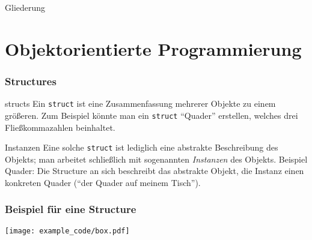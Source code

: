\documentclass[18pt]{beamer}
\author{Robert Schneider, Sven Brauch}
\institute{}
\begin{document}

\AtBeginSection[]{%
	\begin{frame}
		\tableofcontents[sectionstyle=show/hide,subsectionstyle=hide/show/hide]
	\end{frame}
	\addtocounter{framenumber}{-1}%
}

\begin{frame}
\titlepage
\end{frame}

\begin{frame}{Gliederung}
\tableofcontents
\end{frame}


\section{Objektorientierte Programmierung}
\begin{frame}
    \frametitle{Structures}
    \begin{block}{structs}
    Ein \texttt{struct} ist eine Zusammenfassung mehrerer Objekte zu einem größeren.
    Zum Beispiel könnte man ein \texttt{struct} "`Quader"' erstellen, welches drei Fließkommazahlen beinhaltet.
    \end{block}
    \begin{block}{Instanzen}
    Eine solche \texttt{struct} ist lediglich eine abstrakte Beschreibung des Objekts; man arbeitet schließlich mit sogenannten \emph{Instanzen} des Objekts. Beispiel Quader: Die Structure an sich beschreibt das abstrakte Objekt, die Instanz einen konkreten Quader ("`der Quader auf meinem Tisch"').
    \end{block}
\end{frame}
\begin{frame}
    \frametitle{Beispiel für eine Structure}
    \vspace{0.7cm}
    \texttt{[image: example\_code/box.pdf]}
\end{frame}
\end{document}
